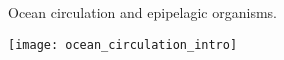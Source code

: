 \documentclass[t]{beamer}
\begin{document}


\begin{frame}[t]{Ocean circulation and epipelagic organisms.}
	\begin{center}
		\texttt{[image: ocean\_circulation\_intro]}
	\end{center}

	\vfilll

\end{frame}
\end{document}
